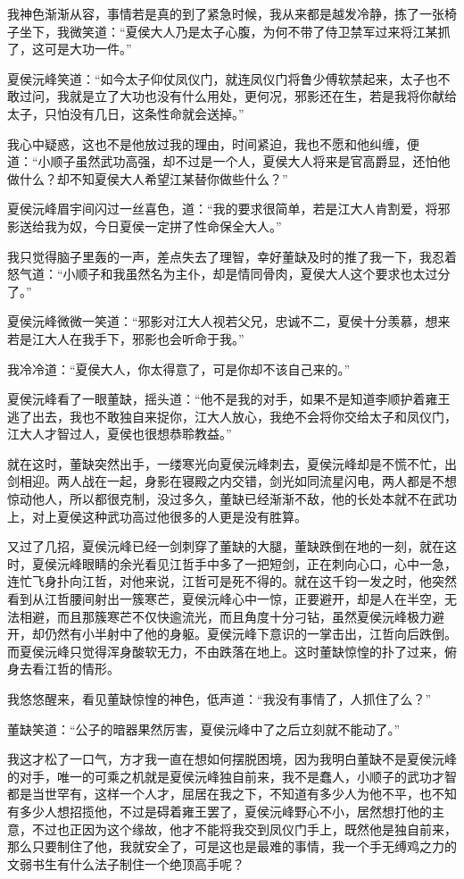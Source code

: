 我神色渐渐从容，事情若是真的到了紧急时候，我从来都是越发冷静，拣了一张椅子坐下，我微笑道：“夏侯大人乃是太子心腹，为何不带了侍卫禁军过来将江某抓了，这可是大功一件。”

夏侯沅峰笑道：“如今太子仰仗凤仪门，就连凤仪门将鲁少傅软禁起来，太子也不敢过问，我就是立了大功也没有什么用处，更何况，邪影还在生，若是我将你献给太子，只怕没有几日，这条性命就会送掉。”

我心中疑惑，这也不是他放过我的理由，时间紧迫，我也不愿和他纠缠，便道：“小顺子虽然武功高强，却不过是一个人，夏侯大人将来是官高爵显，还怕他做什么？却不知夏侯大人希望江某替你做些什么？”

夏侯沅峰眉宇间闪过一丝喜色，道：“我的要求很简单，若是江大人肯割爱，将邪影送给我为奴，今日夏侯一定拼了性命保全大人。”

我只觉得脑子里轰的一声，差点失去了理智，幸好董缺及时的推了我一下，我忍着怒气道：“小顺子和我虽然名为主仆，却是情同骨肉，夏侯大人这个要求也太过分了。”

夏侯沅峰微微一笑道：“邪影对江大人视若父兄，忠诚不二，夏侯十分羡慕，想来若是江大人在我手下，邪影也会听命于我。”

我冷冷道：“夏侯大人，你太得意了，可是你却不该自己来的。”

夏侯沅峰看了一眼董缺，摇头道：“他不是我的对手，如果不是知道李顺护着雍王逃了出去，我也不敢独自来捉你，江大人放心，我绝不会将你交给太子和凤仪门，江大人才智过人，夏侯也很想恭聆教益。”

就在这时，董缺突然出手，一缕寒光向夏侯沅峰刺去，夏侯沅峰却是不慌不忙，出剑相迎。两人战在一起，身影在寝殿之内交错，剑光如同流星闪电，两人都是不想惊动他人，所以都很克制，没过多久，董缺已经渐渐不敌，他的长处本就不在武功上，对上夏侯这种武功高过他很多的人更是没有胜算。

又过了几招，夏侯沅峰已经一剑刺穿了董缺的大腿，董缺跌倒在地的一刻，就在这时，夏侯沅峰眼睛的余光看见江哲手中多了一把短剑，正在刺向心口，心中一急，连忙飞身扑向江哲，对他来说，江哲可是死不得的。就在这千钧一发之时，他突然看到从江哲腰间射出一簇寒芒，夏侯沅峰心中一惊，正要避开，却是人在半空，无法相避，而且那簇寒芒不仅快逾流光，而且角度十分刁钻，虽然夏侯沅峰极力避开，却仍然有小半射中了他的身躯。夏侯沅峰下意识的一掌击出，江哲向后跌倒。而夏侯沅峰只觉得浑身酸软无力，不由跌落在地上。这时董缺惊惶的扑了过来，俯身去看江哲的情形。

我悠悠醒来，看见董缺惊惶的神色，低声道：“我没有事情了，人抓住了么？”

董缺笑道：“公子的暗器果然厉害，夏侯沅峰中了之后立刻就不能动了。”

我这才松了一口气，方才我一直在想如何摆脱困境，因为我明白董缺不是夏侯沅峰的对手，唯一的可乘之机就是夏侯沅峰独自前来，我不是蠢人，小顺子的武功才智都是当世罕有，这样一个人才，屈居在我之下，不知道有多少人为他不平，也不知有多少人想招揽他，不过是碍着雍王罢了，夏侯沅峰野心不小，居然想打他的主意，不过也正因为这个缘故，他才不能将我交到凤仪门手上，既然他是独自前来，那么只要制住了他，我就安全了，可是这也是最难的事情，我一个手无缚鸡之力的文弱书生有什么法子制住一个绝顶高手呢？

